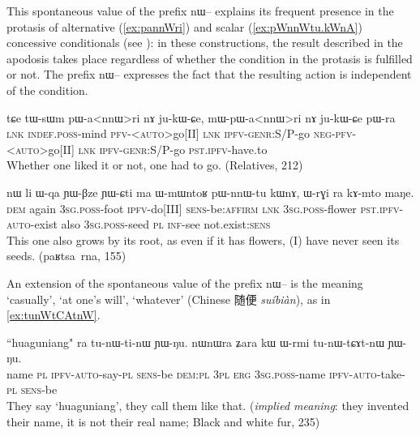 \documentclass[oldfontcommands,oneside,a4paper,11pt]{article}
\newcommand{\ipa}[1]{{\phon \mbox{#1}}} %
\newcommand{\zh}[1]{{\cn #1}}
\begin{document}
This spontaneous value of the prefix \ipa{nɯ--}  explains its frequent presence in the protasis of alternative  (\ref{ex:pannWri}) and scalar (\ref{ex:pWnnWtu.kWnA})  concessive conditionals (see \citealt{jacques14linking}): in these constructions, the result described in the apodosis takes place regardless of whether the condition in the protasis is fulfilled or not. The prefix \ipa{nɯ--} expresses the fact that the resulting action is independent of the condition.

\begin{exe}
\ex  \label{ex:pannWri}
\gll
\ipa{tɕe}  	\ipa{tɯ-sɯm}  	\ipa{pɯ-a<nnɯ>ri}  	\ipa{nɤ}  	\ipa{ju-kɯ-ɕe,}  \ipa{mɯ-pɯ-a<nnɯ>ri}  	\ipa{nɤ}  	\ipa{ju-kɯ-ɕe}  	\ipa{pɯ-ra}  \\
\textsc{lnk} \textsc{indef.poss}-mind  \textsc{pfv-<auto>}go[II] \textsc{lnk} \textsc{ipfv-genr}:S/P-go \textsc{neg-pfv-<auto>}go[II] \textsc{lnk} \textsc{ipfv-genr}:S/P-go \textsc{pst.ipfv}-have.to \\
\glt Whether one liked it or not, one had to go. (Relatives, 212)
\end{exe}


 \begin{exe}
\ex  \label{ex:pWnnWtu.kWnA}
\gll
\ipa{nɯ}    	\ipa{li}    	\ipa{ɯ-qa}    	\ipa{ɲɯ-βze}    	\ipa{ɲɯ-ɕti}    	\ipa{ma}    	\ipa{ɯ-mɯntoʁ}    	\ipa{pɯ-nnɯ-tu}    	\ipa{kɯnɤ,}    	\ipa{ɯ-rɣi}    	\ipa{ra}    	\ipa{kɤ-mto}    	\ipa{maŋe.}    \\
\textsc{dem} again \textsc{3sg.poss}-foot \textsc{ipfv}-do[III] \textsc{sens}-be:\textsc{affirm} \textsc{lnk} \textsc{3sg.poss}-flower \textsc{pst.ipfv-auto}-exist also \textsc{3sg.poss}-seed \textsc{pl} \textsc{inf}-see not.exist:\textsc{sens} \\
\glt This one also grows by its root, as even if it has flowers, (I) have never seen its seeds. (\ipa{paʁtsa rna}, 155)
\end{exe}


An extension of the spontaneous value of the prefix \ipa{nɯ--} is the meaning `casually', `at one's will', `whatever' (Chinese \zh{随便} \textit{suíbiàn}), as in \ref{ex:tunWtCAtnW}. 

\begin{exe}
\ex \label{ex:tunWtCAtnW}
\gll
``huaguniang" \ipa{ra}  	\ipa{tu-nɯ-ti-nɯ}  	\ipa{ɲɯ-ŋu.}  	\ipa{nɯnɯra}  	\ipa{ʑara}  	\ipa{kɯ}  	\ipa{ɯ-rmi}  	\ipa{tu-nɯ-tɕɤt-nɯ}  	\ipa{ɲɯ-ŋu.}  \\
name \textsc{pl}	\textsc{ipfv-auto}-say-\textsc{pl}	\textsc{sens}-be	\textsc{dem:pl}	\textsc{3pl}	\textsc{erg}	\textsc{3sg.poss}-name	\textsc{ipfv-auto}-take-\textsc{pl}	\textsc{sens}-be\\
\glt They say `huaguniang', they call them like that. (\textit{implied meaning}: they invented their name, it is not their real name; Black and white fur, 235)
\end{exe}
\end{document}
